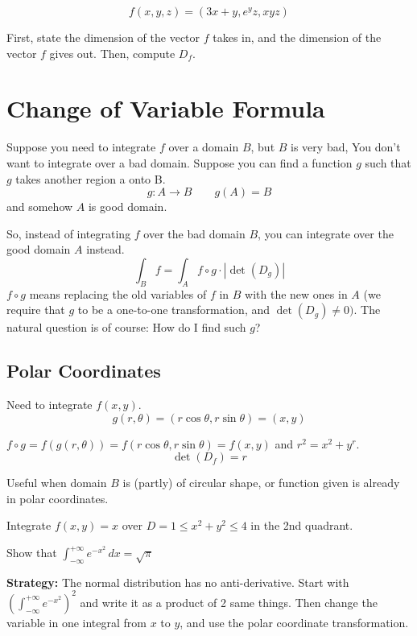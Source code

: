 \begin{exercise}
    $$f(x, y, z) = (3x + y, e^yz, xyz)$$

    First, state the dimension of the vector $f$ takes in, and the dimension of the vector $f$ gives out. Then, compute $D_f$.
\end{exercise}

\section{Change of Variable Formula}

Suppose you need to integrate $f$ over a domain $B$, but $B$ is very bad, You don't want to integrate over a bad domain. Suppose you can find a function $g$ such that $g$ takes another region a onto B. $$g: A \to B \qquad g(A) = B$$ and somehow $A$ is good domain. 

So, instead of integrating $f$ over the bad domain $B$, you can integrate over the good domain $A$ instead. $$\int_B f = \int_A f \circ g \cdot \left| \det(D_g) \right|$$ $f \circ g$ means replacing the old variables of $f$ in $B$ with the new ones in $A$ (we require that $g$ to be a one-to-one transformation, and $\det(D_g) \neq 0)$. The natural question is of course: How do I find such $g$?

\subsection*{Polar Coordinates}

Need to integrate $f(x, y)$. 
$$g(r,\theta) = (r\cos{\theta},r\sin{\theta}) = (x,y)$$

$f \circ g = f(g(r, \theta)) = f(r\cos{\theta}, r\sin{\theta}) = f(x, y)$ and $r^2 = x^2 + y^r$. 
$$\det(D_f) = r$$

Useful when domain $B$ is (partly) of circular shape, or function given is already in polar coordinates.

\begin{exercise}
    Integrate $f(x,y) = x$ over $D = {1 \le x^2 + y^2 \le 4}$ in the 2nd quadrant.
\end{exercise}

\begin{exercise}
    Show that $\int_{-\infty}^{+\infty} e^{-x^2} \,dx = \sqrt{\pi}$

    \textbf{Strategy: } The normal distribution has no anti-derivative. Start with $\left( \int_{-\infty}^{+\infty} e^{-x^2} \right)^2$ and write it as a product of 2 same things. Then change the variable in one integral from $x$ to $y$, and use the polar coordinate transformation.
\end{exercise}